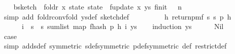 \begin{isabellebody}
\ \ \isamarkupfalse%
\ b{\isacharcolon}{\kern0pt}{\isachardoublequoteopen}sketch\ {\isacharequal}{\kern0pt}\ foldr\ {\isacharparenleft}{\kern0pt}{\isasymlambda}x\ state{\isachardot}{\kern0pt}\ state\ {\isasymbind}\ f{}{\isacharunderscore}{\kern0pt}update\ x{\isacharparenright}{\kern0pt}\ ys\ {\isacharparenleft}{\kern0pt}f{}{\isacharunderscore}{\kern0pt}init\ {\isasymdelta}\ {\isasymepsilon}\ n{\isacharparenright}{\kern0pt}{\isachardoublequoteclose}\isanewline
\ \ \ \ \isamarkupfalse%
\ {\isacharparenleft}{\kern0pt}simp\ add{\isacharcolon}{\kern0pt}\ foldr{\isacharunderscore}{\kern0pt}conv{\isacharunderscore}{\kern0pt}fold\ ys{\isacharunderscore}{\kern0pt}def\ sketch{\isacharunderscore}{\kern0pt}def{\isacharparenright}{\kern0pt}\isanewline
\ \ \isamarkupfalse%
\ \isamarkupfalse%
\ {\isachardoublequoteopen}{\isachardot}{\kern0pt}{\isachardot}{\kern0pt}{\isachardot}{\kern0pt}\ {\isacharequal}{\kern0pt}\ {\isasymOmega}\ {\isasymbind}\ {\isacharparenleft}{\kern0pt}{\isasymlambda}h{\isachardot}{\kern0pt}\ return{\isacharunderscore}{\kern0pt}pmf\ {\isacharparenleft}{\kern0pt}s\ s\ p{\isacharcomma}{\kern0pt}\ h{\isacharcomma}{\kern0pt}\ \isanewline
\ \ \ \ \ \ {\isasymlambda}i\ {\isasymin}\ {\isacharbraceleft}{\kern0pt}{}{\isachardot}{\kern0pt}{\isachardot}{\kern0pt}{\isacharless}{\kern0pt}s\ {\isasymtimes}\ {\isacharbraceleft}{\kern0pt}{}{\isachardot}{\kern0pt}{\isachardot}{\kern0pt}{\isacharless}{\kern0pt}s\ sum{\isacharunderscore}{\kern0pt}list\ {\isacharparenleft}{\kern0pt}map\ {\isacharparenleft}{\kern0pt}f{}{\isacharunderscore}{\kern0pt}hash\ p\ {\isacharparenleft}{\kern0pt}h\ i{\isacharparenright}{\kern0pt}{\isacharparenright}{\kern0pt}\ ys{\isacharparenright}{\kern0pt}{\isacharparenright}{\kern0pt}{\isacharparenright}{\kern0pt}{\isachardoublequoteclose}\isanewline
\ \ \isamarkupfalse%
\ {\isacharparenleft}{\kern0pt}induction\ ys{\isacharparenright}{\kern0pt}\isanewline
\ \ \ \ \isamarkupfalse%
\ Nil\isanewline
\ \ \ \ \isamarkupfalse%
\ \isamarkupfalse%
\ {\isacharquery}{\kern0pt}case\ \isanewline
\ \ \ \ \ \ \isamarkupfalse%
\ {\isacharparenleft}{\kern0pt}simp\ add{\isacharcolon}{\kern0pt}sdef\ {\isacharbrackleft}{\kern0pt}symmetric{\isacharbrackright}{\kern0pt}\ sdef{\isacharbrackleft}{\kern0pt}symmetric{\isacharbrackright}{\kern0pt}\ p{\isacharunderscore}{\kern0pt}def{\isacharbrackleft}{\kern0pt}symmetric{\isacharbrackright}{\kern0pt}\ {\isasymOmega}{\isacharunderscore}{\kern0pt}def\ restrict{\isacharunderscore}{\kern0pt}def{\isacharparenright}{\kern0pt}\ \isanewline

\end{isabellebody}
